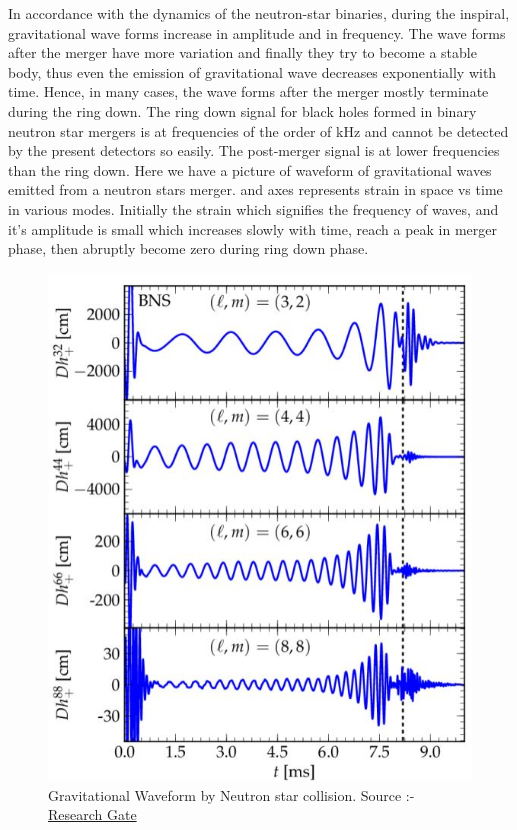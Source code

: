 In accordance with the dynamics of the neutron-star binaries, during the inspiral, gravitational wave forms increase in amplitude and in frequency. 
The wave forms after the merger have more variation and finally they try to become a stable body, thus even the emission of gravitational wave decreases exponentially with time. Hence, in many cases, the wave forms after the merger mostly terminate during the ring down. The ring down signal for black holes formed in binary neutron star mergers is at frequencies of the order of kHz and cannot be detected by the present detectors so easily. The post-merger signal is at lower frequencies than the ring down. Here we have a picture of waveform of gravitational waves emitted from a neutron stars merger. and axes represents strain in space vs time in various modes. Initially the strain which signifies the frequency of waves, and it's amplitude is small which increases slowly with time, reach a peak in merger phase, then abruptly become zero during ring down phase.

\begin{figure}[h]
    \centering
    \includegraphics[scale=0.74]{images.tex/WAVEFORM.jpeg}
    \caption{Gravitational Waveform by Neutron star collision. Source :- \href{https://www.researchgate.net/figure/Binary-neutron-stars-GW-modes-m-3-2-4-4-6-6-8-8-of-polarization_fig13_233846764}{Research Gate}}
\end{figure}

\pagebreak
